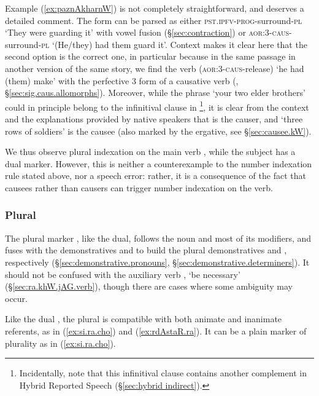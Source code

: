 Example (\ref{ex:paznAkharnW}) is not completely straightforward, and deserves a detailed comment. The form  can be parsed as either  \textsc{pst}.\textsc{ipfv}-\textsc{prog}-surround-\textsc{pl} `They were guarding it' with vowel fusion (§\ref{sec:contraction}) or  \textsc{aor}:3\flobv{}-\textsc{caus}-surround-\textsc{pl} `(He/they) had them guard it'. Context makes it clear here that the second option is the correct one, in particular because in the same passage in another version of the same story, we find the verb  (\textsc{aor}:3\flobv{}-\textsc{caus}-release) `he had (them) make' with the perfective 3\flobv{} form of a causative verb (\citealt[242]{jacques16complementation}, §\ref{sec:sig.caus.allomorphs}). Moreover, while the phrase   `your two elder brothers' could in principle belong to the infinitival clause in \footnote{Incidentally, note that this infinitival clause contains another complement in Hybrid Reported Speech (§\ref{sec:hybrid indirect}).}, it is clear from the context and the explanations provided by native speakers that  is the causer, and  `three rows of soldiers' is the causee (also marked by the ergative, see §\ref{sec:causee.kW}). 

We thus observe plural indexation  on the main verb , while the subject   has a dual marker. However, this is neither a counterexample to the number indexation rule stated above, nor a speech error: rather, it is a consequence of the fact that causees rather than causers can trigger number indexation on the verb.

\subsubsection{Plural} \label{sec:plural.determiners}
The plural marker , like the dual, follows the noun and most of its modifiers, and fuses with the demonstratives  and  to build the plural demonstratives  and , respectively (§\ref{sec:demonstrative.pronouns}, §\ref{sec:demonstrative.determiners}).  It should not be confused with the auxiliary verb , `be necessary' (§\ref{sec:ra.khW.jAG.verb}), though there are cases where some ambiguity may occur.

Like the dual , the plural  is compatible with both animate and inanimate referents, as in (\ref{ex:si.ra.cho}) and (\ref{ex:rdAstaR.ra}). It can be a plain marker of plurality as in (\ref{ex:si.ra.cho}).

